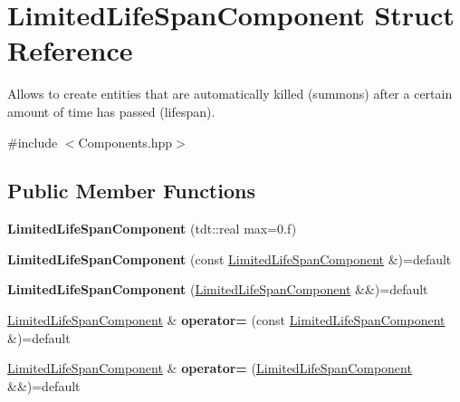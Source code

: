 \hypertarget{struct_limited_life_span_component}{}\section{Limited\+Life\+Span\+Component Struct Reference}
\label{struct_limited_life_span_component}


Allows to create entities that are automatically killed (summons) after a certain amount of time has passed (lifespan).  




{\ttfamily \#include $<$Components.\+hpp$>$}

\subsection*{Public Member Functions}
\begin{DoxyCompactItemize}
\item 
{\bfseries Limited\+Life\+Span\+Component} (tdt\+::real max=0.f)\hypertarget{struct_limited_life_span_component_a41a11ccc2b41be1c2ec9aec57fc70e3e}{}\label{struct_limited_life_span_component_a41a11ccc2b41be1c2ec9aec57fc70e3e}

\item 
{\bfseries Limited\+Life\+Span\+Component} (const \hyperlink{struct_limited_life_span_component}{Limited\+Life\+Span\+Component} \&)=default\hypertarget{struct_limited_life_span_component_af9b148d4d3335fe27f79d2313210f2b2}{}\label{struct_limited_life_span_component_af9b148d4d3335fe27f79d2313210f2b2}

\item 
{\bfseries Limited\+Life\+Span\+Component} (\hyperlink{struct_limited_life_span_component}{Limited\+Life\+Span\+Component} \&\&)=default\hypertarget{struct_limited_life_span_component_aab4f274ec695cf686ed97b0fe9d59945}{}\label{struct_limited_life_span_component_aab4f274ec695cf686ed97b0fe9d59945}

\item 
\hyperlink{struct_limited_life_span_component}{Limited\+Life\+Span\+Component} \& {\bfseries operator=} (const \hyperlink{struct_limited_life_span_component}{Limited\+Life\+Span\+Component} \&)=default\hypertarget{struct_limited_life_span_component_a731d9304fd1e0bf7ab45df6b4b2d347c}{}\label{struct_limited_life_span_component_a731d9304fd1e0bf7ab45df6b4b2d347c}

\item 
\hyperlink{struct_limited_life_span_component}{Limited\+Life\+Span\+Component} \& {\bfseries operator=} (\hyperlink{struct_limited_life_span_component}{Limited\+Life\+Span\+Component} \&\&)=default\hypertarget{struct_limited_life_span_component_ab1d4ee3212d6b080e5d049bdd963de12}{}\label{struct_limited_life_span_component_ab1d4ee3212d6b080e5d049bdd963de12}

\end{DoxyCompactItemize}
